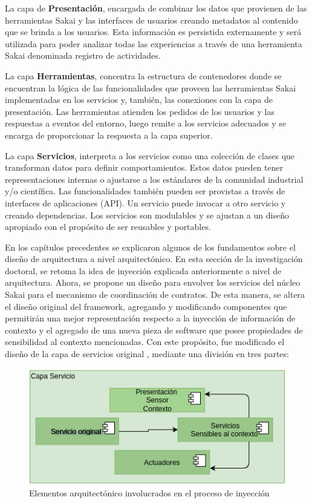 La capa de \textbf{Presentación}, encargada de combinar los datos que provienen de las herramientas Sakai y las interfaces de usuarios creando metadatos al contenido que se brinda a los usuarios. Esta información es persistida externamente y será utilizada para poder analizar todas las experiencias a través de una herramienta Sakai denominada registro de actividades.  

La capa \textbf{Herramientas}, concentra la estructura de contenedores donde se encuentran la lógica de las funcionalidades que proveen las herramientas Sakai implementadas en los servicios y, también, las conexiones con la capa de presentación. Las herramientas atienden los pedidos de los usuarios y las respuestas a eventos del entorno, luego remite a los servicios adecuados y se encarga de proporcionar la respuesta a la capa superior.


La capa \textbf{Servicios}, interpreta a los servicios como una colección de clases que transforman datos para definir comportamientos. Estos datos pueden tener representaciones internas o ajustarse a los estándares de la comunidad industrial y/o científica. Las funcionalidades también pueden ser provistas a través de interfaces de aplicaciones (API). Un servicio puede invocar a otro servicio y creando dependencias. Los servicios son modulables y se ajustan a un diseño apropiado con el propósito de ser reusables y portables.

En los  capítulos precedentes se explicaron algunos de los fundamentos sobre el diseño de arquitectura a nivel arquitectónico. En esta sección de la investigación doctoral, se retoma la idea de inyección explicada anteriormente a nivel de arquitectura. Ahora, se propone un diseño para envolver los servicios del núcleo Sakai para el mecanismo de coordinación de contratos. De esta manera, se altera el diseño original del framework, agregando y modificando componentes que permitirán una mejor representación respecto a la inyección de información de contexto y el agregado de una nueva pieza de software que posee propiedades de sensibilidad al contexto mencionadas. Con este propósito, fue modificado el diseño de la capa de servicios original \cite{arqDHD17}, mediante una división en tres partes:


\begin{figure}
\begin{center}
\includegraphics[scale=0.55]{Ch2/CapaServicio.png}
\caption{Elementos arquitectónico involucrados en el proceso de inyección} \label{fig:CapaServicio}
\end{center}
\end{figure} 



